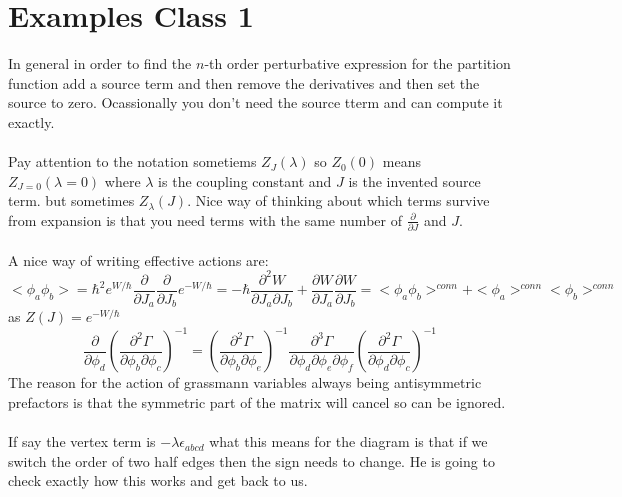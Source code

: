 \documentclass{article}
\begin{document}
\section{Examples Class 1}
In general in order to find the $n$-th order perturbative expression for the partition function add a source term and then remove the derivatives and then set the source to zero. Ocassionally you don't need the source tterm and can compute it exactly.\\\\
Pay attention to the notation sometiems $Z_J(\lambda)$ so $Z_0(0)$ means $Z_{J=0}(\lambda = 0)$ where $\lambda$ is the coupling constant and $J$ is the invented source term. but sometimes $Z_{\lambda}(J)$. Nice way of thinking about which terms survive from expansion is that you need terms with the same number of $\frac{\partial}{\partial J}$ and $J$.\\\\
A nice way of writing effective actions are:
$$
< \phi_a \phi_b > = \hbar^2 e^{W/\hbar} \frac{\partial}{\partial J_a} \frac{\partial}{\partial J_b} e^{-W/ \hbar} = - \hbar \frac{\partial^2 W}{\partial J_a \partial J_b} + \frac{\partial W}{\partial J_a} \frac{\partial W}{\partial J_b} = < \phi_a \phi_b>^{conn} + < \phi_a>^{conn} < \phi_b>^{conn}
$$
as $Z(J) = e^{-W/\hbar}$
$$
\frac{\partial}{\partial \phi_d} ( \frac{\partial^2 \Gamma}{\partial \phi_b \partial \phi_c})^{-1} = (\frac{\partial^2 \Gamma}{\partial \phi_b \partial \phi_e})^{-1}  \frac{\partial^3 \Gamma}{\partial \phi_d \partial \phi_e \partial \phi_f}( \frac{\partial^2 \Gamma}{\partial \phi_d \partial \phi_c})^{-1} 

$$
The reason for the action of grassmann variables always being antisymmetric prefactors is that the symmetric part of the matrix will cancel so can be ignored.\\\\
If say the vertex term is $-\lambda \epsilon_{abcd}$ what this means for the diagram is that if we switch the order of two half edges then the sign needs to change. He is going to check exactly how this works and get back to us.
\end{document}
